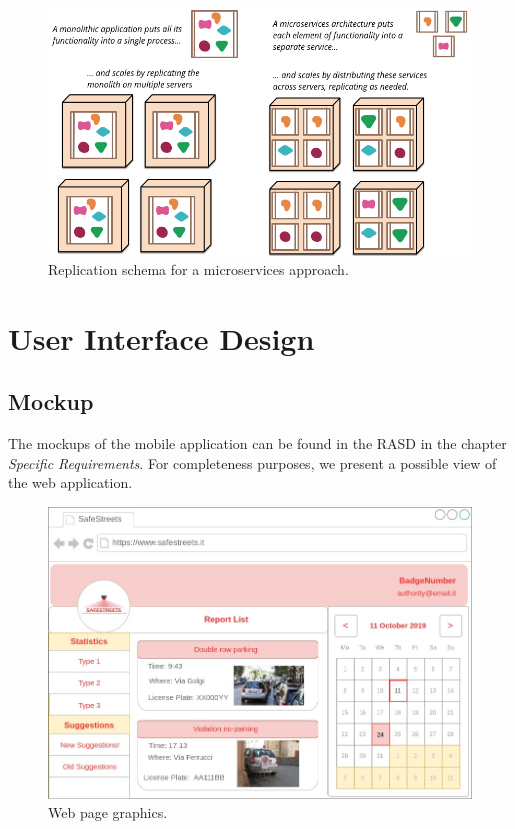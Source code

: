 \documentclass{report}
\begin{document}
\begin{figure}[!ht]
	\begin{center}
	\includegraphics[width=\textwidth]{img/replication.png}
	\end{center}
	\caption{Replication schema for a microservices approach.}
\end{figure}

\chapter{User Interface Design}
\section{Mockup}
The mockups of the mobile application can be found in the RASD in the chapter \textit{Specific Requirements}. For completeness purposes, we present a possible view of the web application.
\begin{figure}[!ht]
	\begin{center}
	\includegraphics[width=\textwidth]{img/MockupAppWeb.png}
	\end{center}
	\caption{Web page graphics.}
\end{figure}
\end{document}
